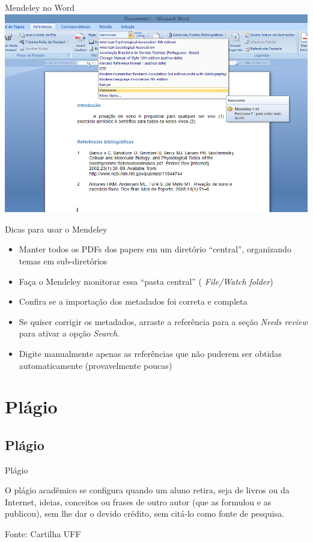 \documentclass{beamer}
\begin{document}
\begin{frame}{Mendeley no Word}
  \includegraphics[width=1.1\textwidth]{Referencias/mendeley-word-vancouver}
\end{frame}

\begin{frame}{Dicas para usar o Mendeley}
  \begin{itemize}
  \item Manter \alert{todos} os PDFs dos papers em um diretório
    ``central'', organizando temas em sub-diretórios
  \item Faça o Mendeley \alert{monitorar} essa ``pasta central'' ({\em
      File/Watch folder})
  \item Confira se a importação dos metadados foi correta e completa
  \item Se quiser corrigir os metadados, arraste a referência para a
    seção {\em Needs review} para ativar a opção {\em Search}.
  \item Digite manualmente apenas as referências que não puderem ser
    obtidas automaticamente (provavelmente poucas)
  \end{itemize}
\end{frame}

\section{Plágio}

\subsection{Plágio}

\begin{frame}{Plágio}
  \begin{definition}
    O plágio acadêmico se configura quando um aluno retira, seja de
    livros ou da Internet, ideias, conceitos ou frases de outro autor
    (que as formulou e as publicou), sem lhe dar o devido crédito, sem
    citá-lo como fonte de pesquisa.
  \end{definition}

  Fonte: Cartilha UFF
\end{frame}
\end{document}

